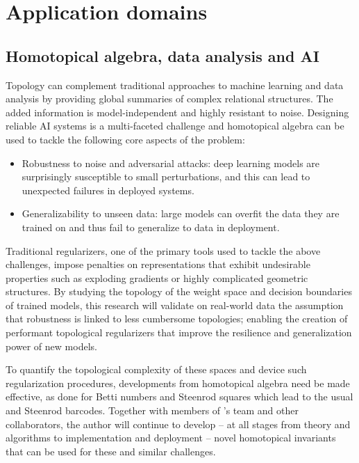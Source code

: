 \section{Application domains} \label{s:future}

\subsection{Homotopical algebra, data analysis and AI} \label{ss:ai}

Topology can complement traditional approaches to machine learning and data analysis by providing global summaries of complex relational structures.
The added information is model-independent and highly resistant to noise.
Designing reliable AI systems is a multi-faceted challenge and homotopical algebra can be used to tackle the following core aspects of the problem:

\begin{itemize}
	\item Robustness to noise and adversarial attacks: deep learning models are surprisingly susceptible to small perturbations, and this can lead to unexpected failures in deployed systems.
	\item Generalizability to unseen data: large models can overfit the data they are trained on and thus fail to generalize to data in deployment.
\end{itemize}
Traditional regularizers, one of the primary tools used to tackle the above challenges, impose penalties on representations that exhibit undesirable properties such as exploding gradients or highly complicated geometric structures.
By studying the topology of the weight space and decision boundaries of trained models, this research will validate on real-world data the assumption that robustness is linked to less cumbersome topologies; enabling the creation of performant topological regularizers that improve the resilience and generalization power of new models.

To quantify the topological complexity of these spaces and device such regularization procedures, developments from homotopical algebra need be made effective, as done for Betti numbers and Steenrod squares which lead to the usual and Steenrod barcodes.
Together with members of \giottoTDA's team and other collaborators, the author will continue to develop -- at all stages from theory and algorithms to implementation and deployment -- novel homotopical invariants that can be used for these and similar challenges.

